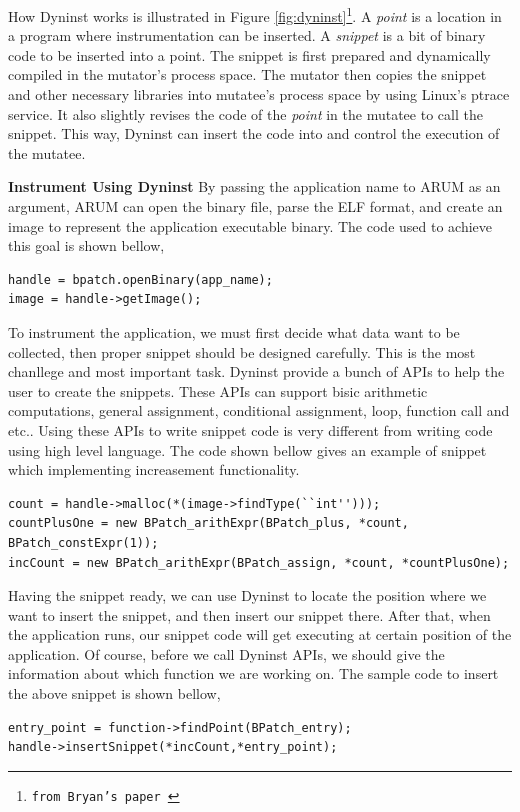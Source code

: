 \documentclass[11pt,letterpaper,oneside]{article}
\begin{document}
How Dyninst works is illustrated in Figure \ref{fig:dyninst}\footnote{\texttt{from Bryan's paper \cite{bib:anapi}}}. A \emph{point} is a location in a program where instrumentation can be inserted. A \emph{snippet} is a bit of binary code to be inserted into a point. The snippet is first prepared and dynamically compiled in the mutator's process space. The mutator then copies the snippet and other necessary libraries into mutatee's process space by using Linux's ptrace service. It also slightly revises the code of the \emph{point} in the mutatee to call the snippet. This way, Dyninst can insert the code into and control the execution of the mutatee.

\noindent \newline\textbf{Instrument Using Dyninst}\newline
\indent By passing the application name to ARUM as an argument, ARUM can open the binary file, parse the ELF format, and create an image to represent the application executable binary. The code used to achieve this goal is shown bellow,
\begin{Verbatim}[frame=single]
handle = bpatch.openBinary(app_name);
image = handle->getImage();
\end{Verbatim}

To instrument the application, we must first decide what data want to be collected, then proper snippet should be designed carefully. This is the most chanllege and most important task. Dyninst provide a bunch of APIs to help the user to create the snippets. These APIs can support bisic arithmetic computations, general assignment, conditional assignment, loop, function call and etc.. Using these APIs to write snippet code is very different from writing code using high level language. The code shown bellow gives an example of snippet which implementing increasement functionality.
\begin{Verbatim}[frame=single]
count = handle->malloc(*(image->findType(``int'')));
countPlusOne = new BPatch_arithExpr(BPatch_plus, *count, BPatch_constExpr(1));
incCount = new BPatch_arithExpr(BPatch_assign, *count, *countPlusOne);
\end{Verbatim}

Having the snippet ready, we can use Dyninst to locate the position where we want to insert the snippet, and then insert our snippet there. After that, when the application runs, our snippet code will get executing at certain position of the application. Of course, before we call Dyninst APIs, we should give the information about which function we are working on. The sample code to insert the above snippet is shown bellow,
\begin{Verbatim}[frame=single]
entry_point = function->findPoint(BPatch_entry);
handle->insertSnippet(*incCount,*entry_point);
\end{Verbatim}
\end{document}

